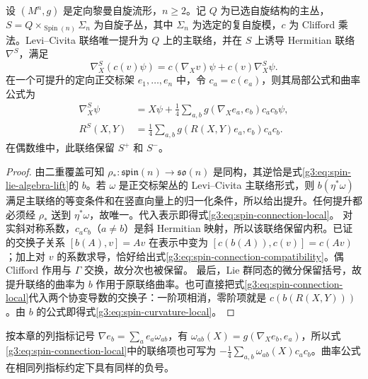 \begin{proposition}\label{g3:prop:spin-connection-curvature}
	设 \((M^n,g)\) 是定向黎曼自旋流形，\(n\ge2\)。记 \(Q\) 为已选自旋结构的主丛，\(S=Q\times_{\operatorname{Spin}(n)}\Sigma_n\) 为自旋子丛，其中 \(\Sigma_n\) 为选定的复自旋模，\(c\) 为 Clifford 乘法。Levi--Civita 联络唯一提升为 \(Q\) 上的主联络，并在 \(S\) 上诱导 Hermitian 联络 \(\nabla^S\)，满足
	\begin{equation}\label{g3:eq:spin-connection-compatibility}
		\nabla^S_X(c(v)\psi)=c(\nabla_Xv)\psi+c(v)\nabla^S_X\psi.
	\end{equation}
	在一个可提升的定向正交标架 \(e_1,\ldots,e_n\) 中，令 \(c_a=c(e_a)\)，则其局部公式和曲率公式为
	\begin{align}
		\nabla^S_X\psi
		&=X\psi+\frac14\sum_{a,b}g(\nabla_Xe_a,e_b)c_ac_b\psi,
		\label{g3:eq:spin-connection-local}\\
		R^S(X,Y)
		&=\frac14\sum_{a,b}g(R(X,Y)e_a,e_b)c_ac_b.
		\label{g3:eq:spin-curvature-local}
	\end{align}
	在偶数维中，此联络保留 \(S^+\) 和 \(S^-\)。
\end{proposition}
\begin{proof}
	由二重覆盖可知 \(\rho_*:\mathfrak{spin}(n)\to\mathfrak{so}(n)\) 是同构，其逆恰是式\eqref{g3:eq:spin-lie-algebra-lift}的 \(b\)。若 \(\omega\) 是正交标架丛的 Levi--Civita 主联络形式，则 \(b(\eta^*\omega)\) 满足主联络的等变条件和在竖直向量上的归一化条件，所以给出提升。任何提升都必须经 \(\rho_*\) 送到 \(\eta^*\omega\)，故唯一。代入表示即得式\eqref{g3:eq:spin-connection-local}。
	对实斜对称系数，\(c_ac_b\)（\(a\ne b\)）是斜 Hermitian 映射，所以该联络保留内积。已证的交换子关系 \([b(A),v]=Av\) 在表示中变为 \([c(b(A)),c(v)]=c(Av)\)；加上对 \(v\) 的系数求导，恰好给出式\eqref{g3:eq:spin-connection-compatibility}。偶 Clifford 作用与 \(\Gamma\) 交换，故分次也被保留。
	最后，Lie 群同态的微分保留括号，故提升联络的曲率为 \(b\) 作用于原联络曲率。也可直接把式\eqref{g3:eq:spin-connection-local}代入两个协变导数的交换子：一阶项相消，零阶项就是 \(c(b(R(X,Y)))\)。由 \(b\) 的公式即得式\eqref{g3:eq:spin-curvature-local}。
\end{proof}

按本章的列指标记号 \(\nabla e_b=\sum_a e_a\omega_{ab}\)，有 \(\omega_{ab}(X)=g(\nabla_Xe_b,e_a)\)，所以式\eqref{g3:eq:spin-connection-local}中的联络项也可写为 \(-\tfrac14\sum_{a,b}\omega_{ab}(X)c_ac_b\)。曲率公式在相同列指标约定下具有同样的负号。

